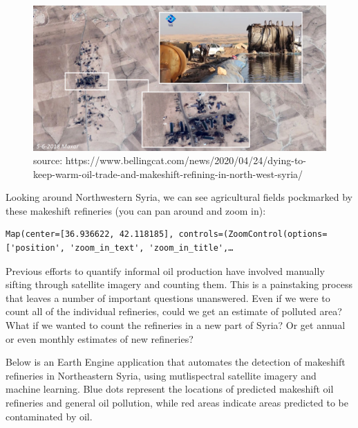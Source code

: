 \documentclass[
  letterpaper,
  DIV=11,
  numbers=noendperiod]{scrreprt}
\begin{document}
\begin{figure}

{\centering \includegraphics{./images/refinery.png}

}

\caption{source:
https://www.bellingcat.com/news/2020/04/24/dying-to-keep-warm-oil-trade-and-makeshift-refining-in-north-west-syria/}

\end{figure}

Looking around Northwestern Syria, we can see agricultural fields
pockmarked by these makeshift refineries (you can pan around and zoom
in):

\begin{verbatim}
Map(center=[36.936622, 42.118185], controls=(ZoomControl(options=['position', 'zoom_in_text', 'zoom_in_title',…
\end{verbatim}

Previous efforts to quantify informal oil production have involved
manually sifting through satellite imagery and counting them. This is a
painstaking process that leaves a number of important questions
unanswered. Even if we were to count all of the individual refineries,
could we get an estimate of polluted area? What if we wanted to count
the refineries in a new part of Syria? Or get annual or even monthly
estimates of new refineries?

Below is an Earth Engine application that automates the detection of
makeshift refineries in Northeastern Syria, using mutlispectral
satellite imagery and machine learning. Blue dots represent the
locations of predicted makeshift oil refineries and general oil
pollution, while red areas indicate areas predicted to be contaminated
by oil.
\end{document}
